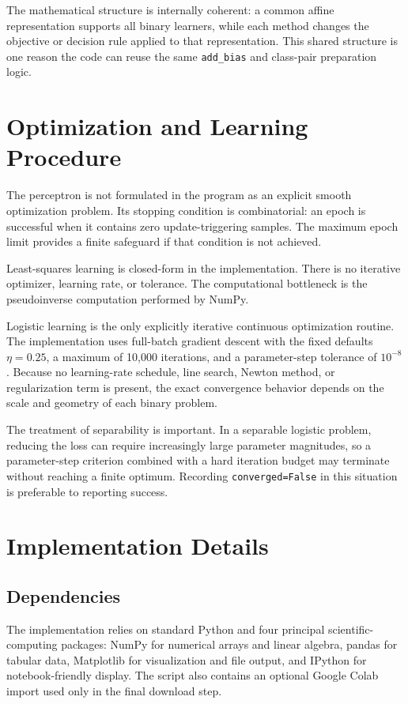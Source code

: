 \documentclass[11pt,a4paper]{article}
\newcommand{\code}[1]{\texttt{#1}}
\begin{document}
The mathematical structure is internally coherent: a common affine representation supports all binary learners, while each method changes the objective or decision rule applied to that representation. This shared structure is one reason the code can reuse the same \code{add\_bias} and class-pair preparation logic.

\section{Optimization and Learning Procedure}
The perceptron is not formulated in the program as an explicit smooth optimization problem. Its stopping condition is combinatorial: an epoch is successful when it contains zero update-triggering samples. The maximum epoch limit provides a finite safeguard if that condition is not achieved.

Least-squares learning is closed-form in the implementation. There is no iterative optimizer, learning rate, or tolerance. The computational bottleneck is the pseudoinverse computation performed by NumPy.

Logistic learning is the only explicitly iterative continuous optimization routine. The implementation uses full-batch gradient descent with the fixed defaults \(\eta=0.25\), a maximum of 10,000 iterations, and a parameter-step tolerance of \(10^{-8}\). Because no learning-rate schedule, line search, Newton method, or regularization term is present, the exact convergence behavior depends on the scale and geometry of each binary problem.

The treatment of separability is important. In a separable logistic problem, reducing the loss can require increasingly large parameter magnitudes, so a parameter-step criterion combined with a hard iteration budget may terminate without reaching a finite optimum. Recording \code{converged=False} in this situation is preferable to reporting success.

\section{Implementation Details}
\subsection{Dependencies}
The implementation relies on standard Python and four principal scientific-computing packages: NumPy for numerical arrays and linear algebra, pandas for tabular data, Matplotlib for visualization and file output, and IPython for notebook-friendly display. The script also contains an optional Google Colab import used only in the final download step.
\end{document}
